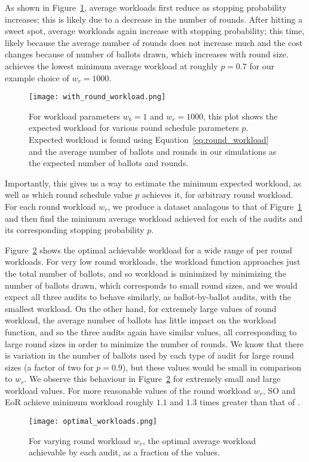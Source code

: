 As shown in Figure~\ref{fig:with_round_workload}, average workloads first reduce as stopping probability increases; this is likely due to a decrease in the number of rounds. After hitting a sweet spot, average workloads again increase with stopping probability; this time, likely because the average number of rounds does not increase much and the cost changes because of number of ballots drawn, which increases with round size. \Providence achieves the lowest minimum average workload at roughly $p=0.7$ for our example choice of $w_r=1000$.

\begin{figure}[h!]
\texttt{[image: with\_round\_workload.png]}
\caption{For workload parameters $w_b=1$ and $w_r=1000$, this plot shows the expected workload for various round schedule parameters $p$. Expected workload is found using Equation~\ref{eq:round_workload} and the average number of ballots and rounds in our simulations as the expected number of ballots and rounds.}
\label{fig:with_round_workload}
\end{figure}

Importantly, this gives us a way to estimate the minimum expected workload, as well as which round schedule value $p$ achieves it, for arbitrary round workload. For each round workload $w_r$, we produce a dataset analagous to that of Figure~\ref{fig:with_round_workload} and then find the minimum average workload achieved for each of the audits and its corresponding stopping probability $p$. 

Figure~\ref{fig:optimal_workloads} shows the optimal achievable workload for a wide range of per round workloads. For very low round workloads, the workload function approaches just the total number of ballots, and so workload is minimized by minimizing the number of ballots drawn, which corresponds to small round sizes, and we would expect all three audits to behave similarly, as ballot-by-ballot audits, with the smallest workload. On the other hand, for extremely large values of round workload, the average number of ballots has little impact on the workload function, and so the three audits again have similar values, all corresponding to large round sizes in order to minimize the number of rounds.  We know that there is variation in the number of ballots used by each type of audit for large round sizes (a factor of two for $p=0.9$), but these values would be small in comparison to $w_r$. We observe this behaviour in Figure~\ref{fig:optimal_workloads} for extremely small and large workload values. For more reasonable values of the round workload $w_r$, SO \BRAVO and EoR \BRAVO achieve minimum workload roughly $1.1$ and $1.3$ times greater than that of \Providence.
\begin{figure}[h!]
\texttt{[image: optimal\_workloads.png]}
\caption{For varying round workload $w_r$, the optimal average workload achievable by each audit, as a fraction of the \Providence values.}
\label{fig:optimal_workloads}
\end{figure}

